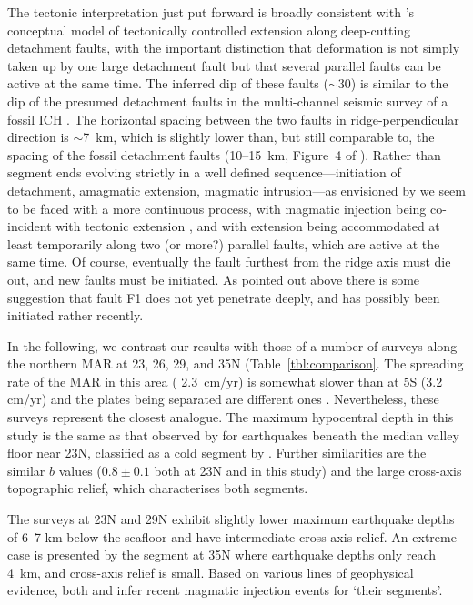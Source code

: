\documentclass[jgr]{aguplus}
\newlength{\tw}
\begin{document}
\begin{article}
The tectonic interpretation just put forward is broadly consistent
with \citeauthor{tucholke94}'s conceptual
model of tectonically controlled extension along deep-cutting
detachment faults, with the important distinction that deformation is
not simply taken up by one large detachment fault but that several
parallel faults can be active at the same time.  The inferred dip of
these faults ($\sim$30\dg) is similar to the dip of the presumed
detachment faults in the multi-channel seismic survey of a fossil ICH
\citep{ranero99}.  The horizontal spacing between the two faults in
ridge-perpendicular direction is $\sim$7~km, which is slightly lower
than, but still comparable to, the spacing of the fossil detachment
faults (10--15~km, Figure~4 of \citet{ranero99}).  Rather than segment
ends evolving strictly in a well defined sequence---initiation of
detachment, amagmatic extension, magmatic intrusion---as envisioned by
\citet{tucholke94} we seem to be faced with a more continuous process,
with magmatic injection being co-incident with tectonic extension
\citep{reston02}, and with extension being accommodated at least
temporarily along two (or more?) parallel faults, which are
active at the same time.
Of course, eventually the fault furthest
from the ridge axis must die out, and new faults must be
initiated. As pointed out above there is some suggestion that fault
F1 does not yet penetrate deeply, and has possibly been initiated
rather recently.

In the following, we contrast our results with those of a number of
surveys along the northern MAR at 23\dg, 26\dg, 29\dg,  and 35\dg N (Table~\ref{tbl:comparison}.  The spreading
rate of the MAR in this area ( 2.3~cm/yr) is somewhat slower than
at 5\dg S (3.2 cm/yr) and the plates being separated are different
ones \citep{demets94}.
Nevertheless, these surveys represent the closest analogue.
The maximum hypocentral depth in this study is the same as that
observed by \citet{toomey88} for earthquakes beneath the median valley
floor near 23\dg N, classified as a cold segment by \citep{thibaud98}. Further similarities are the
similar $b$ values ($0.8\pm0.1$ both at 23\dg N and in this
study) and the large cross-axis topographic relief, which
characterises both segments.

The surveys at 23\dg N \citep{kong92} and 29\dg N \citep{wolfe95}
exhibit slightly lower maximum earthquake depths of 6--7 km below the
seafloor and have intermediate cross axis relief.  An extreme case is
presented by the segment at 35\dg N \citep{barclay01} where earthquake
depths only reach 4~km, and cross-axis relief is small.  Based on
various lines of geophysical evidence, both
\citet{kong92} and \citet{barclay01} infer recent magmatic injection
events for `their segments'.


\end{article}
\end{document}
